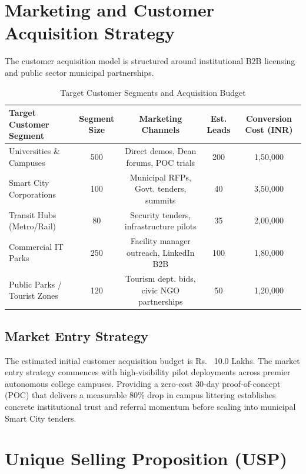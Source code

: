 \documentclass[12pt,a4paper]{report}
\begin{document}
\section{Marketing and Customer Acquisition Strategy}
The customer acquisition model is structured around institutional B2B licensing and public sector municipal partnerships.

\begin{table}[htbp]
\centering
\caption{Target Customer Segments and Acquisition Budget}
\label{tab:cust_acq}
\begin{tabularx}{\textwidth}{lcccc}
\toprule
\textbf{Target Customer Segment} & \textbf{Segment Size} & \textbf{Marketing Channels} & \textbf{Est. Leads} & \textbf{Conversion Cost (INR)} \\
\midrule
Universities \& Campuses & 500 & Direct demos, Dean forums, POC trials & 200 & 1,50,000 \\
Smart City Corporations & 100 & Municipal RFPs, Govt. tenders, summits & 40 & 3,50,000 \\
Transit Hubs (Metro/Rail) & 80 & Security tenders, infrastructure pilots & 35 & 2,00,000 \\
Commercial IT Parks & 250 & Facility manager outreach, LinkedIn B2B & 100 & 1,80,000 \\
Public Parks / Tourist Zones & 120 & Tourism dept. bids, civic NGO partnerships & 50 & 1,20,000 \\
\bottomrule
\end{tabularx}
\end{table}

\subsection{Market Entry Strategy}
The estimated initial customer acquisition budget is Rs.~ 10.0 Lakhs. The market entry strategy commences with high-visibility pilot deployments across premier autonomous college campuses. Providing a zero-cost 30-day proof-of-concept (POC) that delivers a measurable 80\% drop in campus littering establishes concrete institutional trust and referral momentum before scaling into municipal Smart City tenders.

\section{Unique Selling Proposition (USP)}
\end{document}
